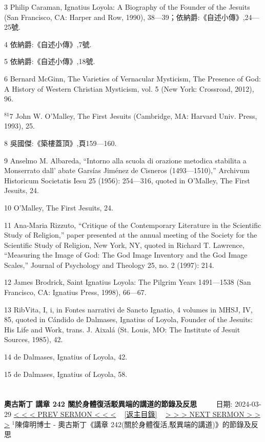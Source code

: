 \documentclass{book}
\begin{document}
3 Philip Caraman, Ignatius Loyola: A Biography of the Founder of the Jesuits (San Francisco, CA: Harper  and  Row, 1990), 38—39；依納爵:《自述小傳》,24—25號.

4 依納爵:《自述小傳》,7號.

5 依納爵:《自述小傳》,18號.

6 Bernard McGinn, The Varieties of Vernacular Mysticism, The Presence of God: A History of Western Christian Mysticism, vol. 5 (New York: Crossroad, 2012), 96.


$^{81}$7 John W. O’Malley, The First Jesuits (Cambridge, MA: Harvard Univ. Press, 1993), 25.

8 吳國傑:《築樓蓋頂》,頁159—160.

9 Anselmo M. Albareda, “Intorno alla scuola di orazione metodica stabilita a Monserrato dall’ abate Garsías Jiménez de Cisneros (1493—1510),” Archivum Historicum Societatis Iesu 25 (1956): 254—316, quoted in O’Malley, The First Jesuits, 24.

10 O’Malley, The First Jesuits, 24.

11 Ana-Maria Rizzuto, “Critique of the Contemporary Literature in the Scientific Study of Religion,” paper presented at the annual meeting of the Society for the Scientific Study of Religion, New York, NY, quoted in Richard T. Lawrence, “Measuring the Image of God: The God Image Inventory and the God Image Scales,” Journal of Psychology and Theology 25, no. 2 (1997): 214.

12 James Brodrick, Saint Ignatius Loyola: The Pilgrim Years 1491—1538 (San Francisco, CA: Ignatius Press, 1998), 66—67.

13 RibVita, I, i, in Fontes narrativi de Sancto Ignatio, 4 volumes in MHSJ, IV, 85, quoted in Cándido de Dalmases, Ignatius of Loyola, Founder of the Jesuits: His Life and Work, trans. J. Aixalá (St. Louis, MO: The Institute of Jesuit Sources, 1985), 42.

14 de Dalmases, Ignatius of Loyola, 42.

15 de Dalmases, Ignatius of Loyola, 58.
\newpage



\section{}
\label{sec:10}
\textbf{奧古斯丁 講章 242 關於身體復活駁異端的講道的節錄及反思}
\newline
\newline
~~~~ 日期: 2024-03-29
\newline
\newline
\hyperref[sec:9]{\small{< < < PREV SERMON < < <}}
~
\hyperref[sec:index]{\small{[返主目錄]}}
~
\hyperref[sec:11]{\small{> > > NEXT SERMON > > >}}
\newline
\newline
$^{1}$陳偉明博士 - 奧古斯丁《講章 242(關於身體復活,駁異端的講道)》的節錄及反思
\end{document}

